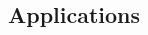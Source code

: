 \documentclass{article}
\theoremstyle{plain}
\newtheorem*{example}{Example}
\theoremstyle{plain}
\newtheorem{theorem}{Theorem}
\begin{document}
\begin{multicols}{2}

%
%


\section{Applications}



\end{multicols}
\end{document}
